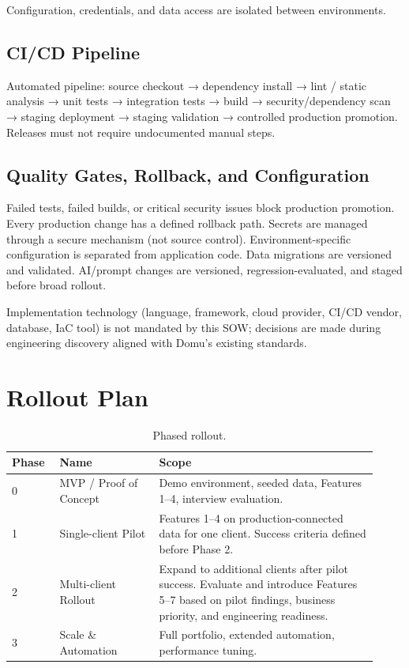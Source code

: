 \documentclass[11pt,a4paper]{article}
\begin{document}
Configuration, credentials, and data access are isolated between environments.

\subsection{CI/CD Pipeline}

Automated pipeline: source checkout → dependency install → lint / static analysis → unit tests → integration tests → build → security/dependency scan → staging deployment → staging validation → controlled production promotion. Releases must not require undocumented manual steps.

\subsection{Quality Gates, Rollback, and Configuration}

Failed tests, failed builds, or critical security issues block production promotion. Every production change has a defined rollback path. Secrets are managed through a secure mechanism (not source control). Environment-specific configuration is separated from application code. Data migrations are versioned and validated. AI/prompt changes are versioned, regression-evaluated, and staged before broad rollout.

Implementation technology (language, framework, cloud provider, CI/CD vendor, database, IaC tool) is not mandated by this SOW; decisions are made during engineering discovery aligned with Domu's existing standards.

\section{Rollout Plan}

\begin{table}[H]
\centering
\small
\begin{tabular}{p{0.12\linewidth}p{0.25\linewidth}p{0.55\linewidth}}
\toprule
\textbf{Phase} & \textbf{Name} & \textbf{Scope} \\
\midrule
0 & MVP / Proof of Concept &
  Demo environment, seeded data, Features 1–4, interview evaluation. \\
1 & Single-client Pilot &
  Features 1–4 on production-connected data for one client. Success criteria defined before Phase 2. \\
2 & Multi-client Rollout &
  Expand to additional clients after pilot success. Evaluate and introduce Features 5--7 based on pilot findings, business priority, and engineering readiness. \\
3 & Scale \& Automation &
  Full portfolio, extended automation, performance tuning. \\
\bottomrule
\end{tabular}
\caption{Phased rollout.}
\end{table}
\end{document}
